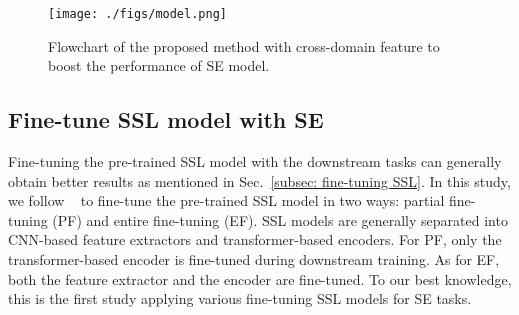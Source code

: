 \documentclass[a4paper]{article}
\begin{document}
\begin{figure}[t]
  \centering
  \texttt{[image: ./figs/model.png]}
  \caption{Flowchart of the proposed method with cross-domain feature to boost the performance of SE model.}
  \label{fig:model}
\end{figure}

\subsection{Fine-tune SSL model with SE}\label{subsec:Finetune SSL model}
Fine-tuning the pre-trained SSL model with the downstream tasks can generally obtain better results as mentioned in Sec.~\ref{subsec: fine-tuning SSL}. In this study, we follow ~\cite{wang2021fine} to fine-tune the pre-trained SSL model in two ways: partial fine-tuning (PF) and entire fine-tuning (EF). SSL models are generally separated into CNN-based feature extractors and transformer-based encoders. For PF, only the transformer-based encoder is fine-tuned during downstream training. As for EF, both the feature extractor and the encoder are fine-tuned. To our best knowledge, this is the first study applying various fine-tuning SSL models for SE tasks.
\end{document}
